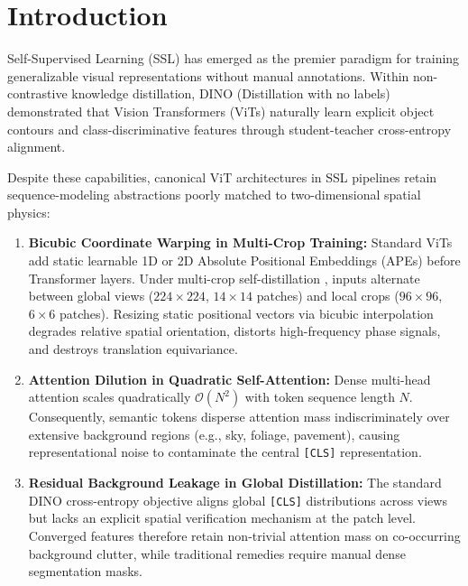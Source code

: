 \documentclass[11pt,a4paper]{article}
\begin{document}
\section{Introduction}
\label{sec:intro}

Self-Supervised Learning (SSL) has emerged as the premier paradigm for training generalizable visual representations without manual annotations. Within non-contrastive knowledge distillation, DINO (Distillation with no labels) \cite{caron2021emerging} demonstrated that Vision Transformers (ViTs) \cite{dosovitskiy2020image} naturally learn explicit object contours and class-discriminative features through student-teacher cross-entropy alignment.

Despite these capabilities, canonical ViT architectures in SSL pipelines retain sequence-modeling abstractions poorly matched to two-dimensional spatial physics:
\begin{enumerate}[leftmargin=*]
    \item \textbf{Bicubic Coordinate Warping in Multi-Crop Training:} Standard ViTs add static learnable 1D or 2D Absolute Positional Embeddings (APEs) before Transformer layers. Under multi-crop self-distillation \cite{caron2020swav, caron2021emerging}, inputs alternate between global views ($224\times 224$, $14\times 14$ patches) and local crops ($96\times 96$, $6\times 6$ patches). Resizing static positional vectors via bicubic interpolation degrades relative spatial orientation, distorts high-frequency phase signals, and destroys translation equivariance.
    \item \textbf{Attention Dilution in Quadratic Self-Attention:} Dense multi-head attention scales quadratically $\mathcal{O}(N^2)$ with token sequence length $N$. Consequently, semantic tokens disperse attention mass indiscriminately over extensive background regions (e.g., sky, foliage, pavement), causing representational noise to contaminate the central \texttt{[CLS]} representation.
    \item \textbf{Residual Background Leakage in Global Distillation:} The standard DINO cross-entropy objective aligns global \texttt{[CLS]} distributions across views but lacks an explicit spatial verification mechanism at the patch level. Converged features therefore retain non-trivial attention mass on co-occurring background clutter, while traditional remedies require manual dense segmentation masks.
\end{enumerate}
\end{document}
